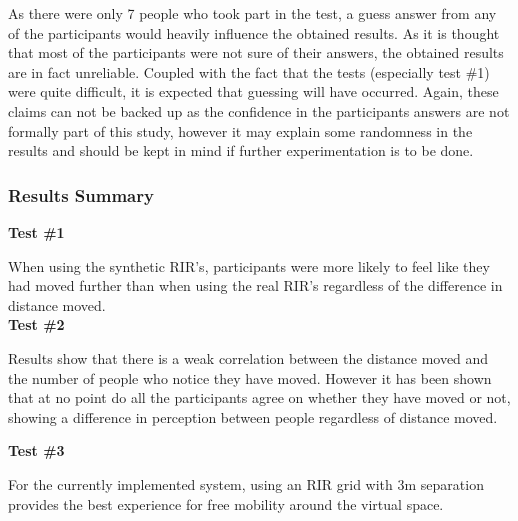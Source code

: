 \documentclass[../../main.tex]{subfiles}
\begin{document}
				As there were only 7 people who took part in the test, a guess answer from any of the participants would heavily influence the obtained results. As it is thought that most of the participants were not sure of their answers, the obtained results are in fact unreliable. Coupled with the fact that the tests (especially test \#1) were quite difficult, it is expected that guessing will have occurred. Again, these claims can not be backed up as the confidence in the participants answers are not formally part of this study, however it may explain some randomness in the results and should be kept in mind if further experimentation is to be done.



			\subsubsection{Results Summary}


				
				\textbf{Test \#1}

				When using the synthetic \ac{RIR}'s, participants were more likely to feel like they had moved further than when using the real \ac{RIR}'s regardless of the difference in distance moved. \\

				\textbf{Test \#2}

				Results show that there is a weak correlation between the distance moved and the number of people who notice they have moved. However it has been shown that at no point do all the participants agree on whether they have moved or not, showing a difference in perception between people regardless of distance moved.
				
				\textbf{Test \#3}

				For the currently implemented system, using an \ac{RIR} grid with 3m separation provides the best experience for free mobility around the virtual space.
			


			
\end{document}
